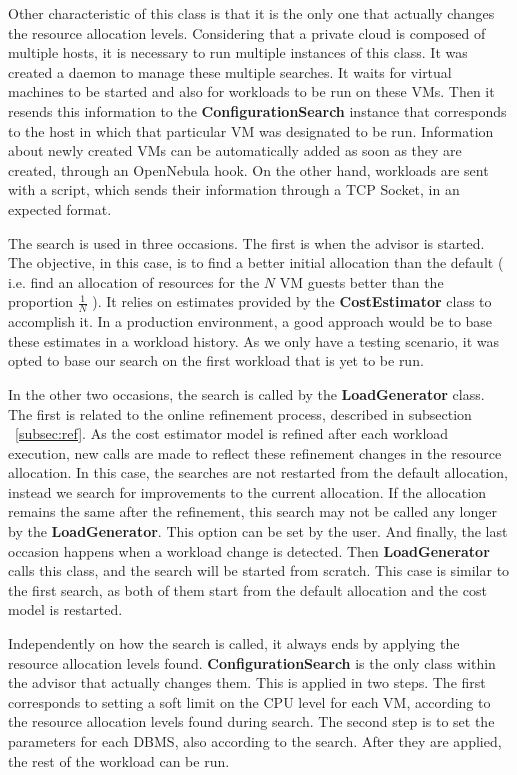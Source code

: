 Other characteristic of this class is that it is the only one that actually changes the resource allocation levels. Considering that a private cloud is composed of multiple hosts, it is necessary to run multiple instances of this class. It was created a daemon to manage these multiple searches. It waits for virtual machines to be started and also for workloads to be run on these VMs. Then it resends this information to the \textbf{ConfigurationSearch} instance that corresponds to the host in which that particular VM was designated to be run. Information about newly created VMs can be automatically added as soon as they are created, through an OpenNebula hook. On the other hand, workloads are sent with a script, which sends their information through a TCP Socket, in an expected format.

The search is used in three occasions. The first is when the advisor is started. The objective, in this case, is to find a better initial allocation than the default ( i.e. find an allocation of resources for the $N$ VM guests better than the proportion $\frac{1}{N}$ ). It relies on estimates provided by the \textbf{CostEstimator} class to accomplish it. In a production environment, a good approach would be to base these estimates in a workload history. As we only have a testing scenario, it was opted to base our search on the first workload that is yet to be run.

In the other two occasions, the search is called by the \textbf{LoadGenerator} class. The first is related to the online refinement process, described in subsection ~\ref{subsec:ref}. As the cost estimator model is refined after each workload execution, new calls are made to reflect these refinement changes in the resource allocation. In this case, the searches are not restarted from the default allocation, instead we search for improvements to the current allocation. If the allocation remains the same after the refinement, this search may not be called any longer by the \textbf{LoadGenerator}. This option can be set by the user. And finally, the last occasion happens when a workload change is detected. Then \textbf{LoadGenerator} calls this class, and the search will be started from scratch. This case is similar to the first search, as both of them start from the default allocation and the cost model is restarted.

Independently on how the search is called, it always ends by applying the resource allocation levels found. \textbf{ConfigurationSearch} is the only class within the advisor that actually changes them. This is applied in two steps. The first corresponds to setting a soft limit on the CPU level for each VM, according to the resource allocation levels found during search. The second step is to set the parameters for each DBMS, also according to the search. After they are applied, the rest of the workload can be run.

